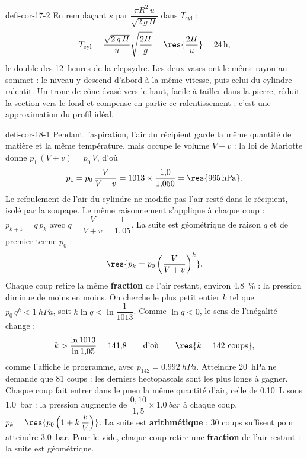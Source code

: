 \begin{blocEdition}{defi-cor-17-2}
\label{figedition-defi-cor-17-2-1}
En remplaçant $s$ par $\dfrac{\pi R^2\,u}{\sqrt{2\,g\,H}}$ dans $T_\mathrm{cyl}$ :
\[T_\mathrm{cyl}=\frac{\sqrt{2\,g\,H}}{u}\sqrt{\frac{2H}{g}}=\res{\frac{2H}{u}}=\qty{24}{h},\]
le double des 12~heures de la clepsydre. Les deux vases ont le même rayon au sommet : le niveau y descend d'abord à la
même vitesse, puis celui du cylindre ralentit. Un tronc de cône évasé vers le haut, facile à tailler dans la pierre,
réduit la section vers le fond et compense en partie ce ralentissement : c'est une approximation du profil idéal.
\end{blocEdition}

\begin{blocEdition}{defi-cor-18-1}
Pendant l'aspiration, l'air du récipient garde la même quantité de matière et la même température, mais occupe le volume
$V+v$ : la loi de Mariotte donne $p_1\,(V+v)=p_0\,V$, d'où
\[p_1=p_0\,\frac{V}{V+v}=1013\times\frac{1{,}0}{1{,}050}=\res{\qty{965}{hPa}}.\]
Le refoulement de l'air du cylindre ne modifie pas l'air resté dans le récipient, isolé par la soupape.
Le même raisonnement s'applique à chaque coup : $p_{k+1}=q\,p_k$ avec $q=\dfrac{V}{V+v}=\dfrac{1}{1{,}05}$. La suite est
géométrique de raison $q$ et de premier terme $p_0$ :
\[\res{p_k=p_0\left(\frac{V}{V+v}\right)^{k}}.\]
Chaque coup retire la même \textbf{fraction} de l'air restant, environ 4,8~\% : la pression diminue de moins en moins.
On cherche le plus petit entier $k$ tel que $p_0\,q^k<\qty{1}{hPa}$, soit $k\ln q<\ln\dfrac{1}{1013}$. Comme $\ln q<0$, le sens de
l'inégalité change :
\[k>\frac{\ln1013}{\ln1{,}05}=141{,}8\qquad\text{d'où}\qquad \res{k=142\ \text{coups}},\]
comme l'affiche le programme, avec $p_{142}=\qty{0,992}{hPa}$. Atteindre \qty{20}{hPa} ne demande que 81 coups : les derniers
hectopascals sont les plus longs à gagner.
Chaque coup fait entrer dans le pneu la même quantité d'air, celle de \qty{0,10}{L} sous \qty{1,0}{bar} : la pression augmente
de $\dfrac{0{,}10}{1{,}5}\times\qty{1,0}{bar}$ à chaque coup, $p_k=\res{p_0\left(1+k\,\dfrac{v}{V}\right)}$. La suite est
\textbf{arithmétique} : 30 coups suffisent pour atteindre \qty{3,0}{bar}. Pour le vide, chaque coup retire une
\textbf{fraction} de l'air restant : la suite est géométrique.
\end{blocEdition}

